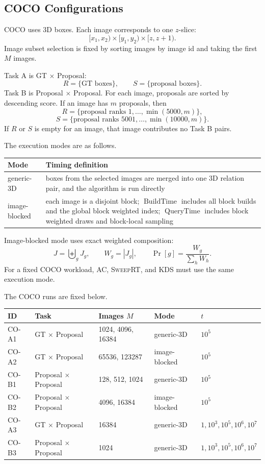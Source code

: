\documentclass[11pt]{article}
\newcommand{\AC}{\textsc{AC}}
\newcommand{\SweepRT}{\textsc{SweepRT}}
\newcommand{\KDS}{\textsc{KDS}}
\newcommand{\BuildTime}{\ensuremath{\operatorname{BuildTime}}}
\newcommand{\QueryTime}{\ensuremath{\operatorname{QueryTime}}}
\begin{document}
\subsection{COCO Configurations}
COCO uses 3D boxes.  Each image corresponds to one $z$-slice:
\[
[x_1,x_2)\times[y_1,y_2)\times[z,z+1).
\]
Image subset selection is fixed by sorting images by image id and taking the first $M$ images.

Task A is GT $\times$ Proposal:
\[
R=\{\text{GT boxes}\},
\qquad
S=\{\text{proposal boxes}\}.
\]
Task B is Proposal $\times$ Proposal.  For each image, proposals are sorted by descending score.  If an image has $m$ proposals, then
\[
R=\{\text{proposal ranks }1,\ldots,\min(5000,m)\},
\]
\[
S=\{\text{proposal ranks }5001,\ldots,\min(10000,m)\}.
\]
If $R$ or $S$ is empty for an image, that image contributes no Task B pairs.

The execution modes are as follows.

\begin{center}
\small
\begin{tabularx}{\linewidth}{@{}lY@{}}
\toprule
Mode & Timing definition \\
\midrule
generic-3D & boxes from the selected images are merged into one 3D relation pair, and the algorithm is run directly \\
image-blocked & each image is a disjoint block; \BuildTime{} includes all block builds and the global block weighted index; \QueryTime{} includes block weighted draws and block-local sampling \\
\bottomrule
\end{tabularx}
\end{center}

Image-blocked mode uses exact weighted composition:
\[
J=\biguplus_g J_g,
\qquad
W_g=|J_g|,
\qquad
\Pr[g]=\frac{W_g}{\sum_h W_h}.
\]
For a fixed COCO workload, \AC, \SweepRT, and \KDS{} must use the same execution mode.

The COCO runs are fixed below.

\begin{center}
\small
\begin{tabularx}{\linewidth}{@{}l Y Y l Y@{}}
\toprule
ID & Task & Images $M$ & Mode & $t$ \\
\midrule
CO-A1 & GT $\times$ Proposal & 1024, 4096, 16384 & generic-3D & $10^5$ \\
CO-A2 & GT $\times$ Proposal & 65536, 123287 & image-blocked & $10^5$ \\
CO-B1 & Proposal $\times$ Proposal & 128, 512, 1024 & generic-3D & $10^5$ \\
CO-B2 & Proposal $\times$ Proposal & 4096, 16384 & image-blocked & $10^5$ \\
CO-A3 & GT $\times$ Proposal & 16384 & generic-3D & $1,10^3,10^5,10^6,10^7$ \\
CO-B3 & Proposal $\times$ Proposal & 1024 & generic-3D & $1,10^3,10^5,10^6,10^7$ \\
\bottomrule
\end{tabularx}
\end{center}
\end{document}
